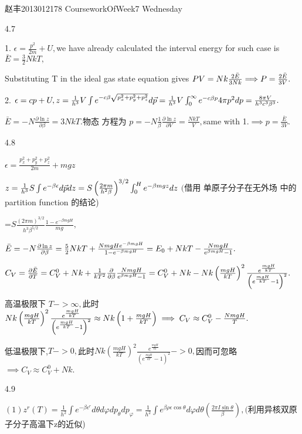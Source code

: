 \documentclass{ctexart}
\begin{document}
\bigskip 赵丰2013012178 CourseworkOfWeek7 Wednesday

4.7

1. $\epsilon =\frac{p^{2}}{2m}+U,$we have already calculated the interval
energy for such case is $\bar{E}=\frac{3}{2}NkT,$

Substituting T in the ideal gas state equation gives $PV=Nk\frac{2\bar{E}}{%
3Nk}\Longrightarrow P=\frac{2\bar{E}}{3V}.$

2. $\epsilon =cp+U,z=\frac{1}{h^{3}}V\int e^{-c\beta \sqrt{%
p_{x}^{2}+p_{y}^{2}+p_{z}^{2}}}d\vec{p}=\frac{1}{h^{3}}V\int_{0}^{\infty
}e^{-c\beta p}4\pi p^{2}dp=\frac{8\pi V}{h^{3}c^{3}\beta ^{3}}.$

$\bar{E}=-N\frac{\partial \ln z}{\partial \beta }=3NkT.$物态%
方程为 $p=-N\frac{1}{\beta }\frac{\partial \ln z}{\partial
V}=\frac{NkT}{V},$same with 1.$\implies p=\frac{\bar{E}}{3V}.$

4.8

\bigskip $\epsilon =\frac{p_{x}^{2}+p_{y}^{2}+p_{z}^{2}}{2m}+mgz$

$z=\frac{1}{h^{3}}S\int e^{-\beta \epsilon }d\vec{p}dz=S\left( \frac{2\pi m}{%
h^{2}\beta }\right) ^{3/2}\int_{0}^{H}e^{-\beta mgz}dz$ $($借用%
单原子分子在无外场%
中的partition function 的结论)

=$S\frac{\left( 2\pi m\right) ^{3/2}}{h^{3}\beta ^{5/2}}\frac{1-e^{-\beta
mgH}}{mg},$

$\bar{E}=-N\frac{\partial \ln z}{\partial \beta }=\frac{5}{2}NkT+\frac{%
NmgHe^{-\beta mgH}}{1-e^{-\beta mgH}}=E_{0}+NkT-\frac{NmgH}{e^{\beta mgH}-1}%
. $

$C_{V}=\frac{\partial \bar{E}}{\partial T}=C_{V}^{0}+Nk+\frac{1}{kT^{2}}%
\frac{\partial }{\partial \beta }\frac{NmgH}{e^{\beta mgH}-1}%
=C_{V}^{0}+Nk-Nk\left( \frac{mgH}{kT}\right) ^{2}\frac{e^{\frac{mgH}{kT}}}{%
\left( e^{\frac{mgH}{kT}}-1\right) ^{2}}.$

高温极限下 $T->\infty ,$此时$%
Nk\left( \frac{mgH}{kT}\right) ^{2}\frac{e^{\frac{mgH}{kT}}}{\left( e^{\frac{%
mgH}{kT}}-1\right) ^{2}}\approx Nk\left( 1+\frac{mgH}{kT}\right) \implies
C_{V}\approx C_{V}^{0}-\frac{NmgH}{T}.$

低温极限下,$T->0,$此时$Nk\left( 
\frac{mgH}{kT}\right) ^{2}\frac{e^{\frac{mgH}{kT}}}{\left( e^{\frac{mgH}{kT}%
}-1\right) ^{2}}->0,$因而可忽略$\implies
C_{V}\approx C_{V}^{0}+Nk.$

4.9

$\left( 1\right) z^{r}\left( T\right) =\frac{1}{h^{2}}\int e^{-\beta
\epsilon ^{r}}d\theta d\varphi dp_{\theta }dp_{\varphi }=\frac{1}{h^{2}}\int
e^{\beta \rho \epsilon \cos \theta }d\varphi d\theta \left( \frac{2\pi I\sin
\theta }{\beta }\right) ,($利用异核双原%
子分子高温下z的近似)
\end{document}
